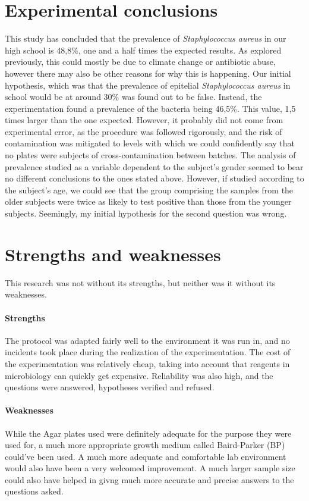 \section{Experimental conclusions}
This study has concluded that the prevalence of \emph{Staphylococcus aureus} in our high school is 48,8\%, one and a half times the expected results. As explored previously, this could mostly be due to climate change or antibiotic abuse, however there may also be other reasons for why this is happening. Our initial hypothesis, which was that the prevalence of epitelial \emph{Staphylococcus aureus} in school would be at around 30\% was found out to be false. Instead, the experimentation found a prevalence of the bacteria being 46,5\%. This value, 1,5 times larger than the one expected. However, it probably did not come from experimental error, as the procedure was followed rigorously, and the risk of contamination was mitigated to levels with which we could confidently say that no plates were subjects of cross-contamination between batches.\newline
The analysis of prevalence studied as a variable dependent to the subject's gender seemed to bear no different conclusions to the ones stated above. However, if studied according to the subject's age, we could see that the group comprising the samples from the older subjects were twice as likely to test positive than those from the younger subjects. Seemingly, my initial hypothesis for the second question was wrong.
\section{Strengths and weaknesses}
This research was not without its strengths, but neither was it without its weaknesses.
\paragraph{Strengths} The protocol was adapted fairly well to the environment it was run in, and no incidents took place during the realization of the experimentation. The cost of the experimentation was relatively cheap, taking into account that reagents in microbiology can quickly get expensive. Reliability was also high, and the questions were answered, hypotheses verified and refused.
\paragraph{Weaknesses} While the Agar plates used were definitely adequate for the purpose they were used for, a much more appropriate growth medium called Baird-Parker (BP) could've been used. A much more adequate and comfortable lab environment would also have been a very welcomed improvement. A much larger sample size could also have helped in givng much more accurate and precise answers to the questions asked.

